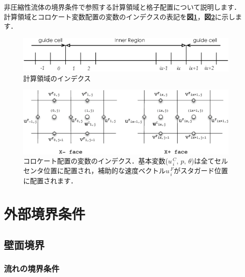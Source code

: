 非圧縮性流体の境界条件で参照する\hypertarget{tgt:grid_arrangement}{計算領域と格子配置}について説明します．
計算領域とコロケート変数配置の変数のインデクスの表記を\textbf{図\ref{fig:index_domain}}，\textbf{図\ref{fig:index_cc}}に示します．

\begin{figure}[htdp]
  \begin{center}
  \includegraphics[width=12cm,clip]{index_domain.eps}
  \end{center}
  \caption{計算領域のインデクス}
  \label{fig:index_domain}
\end{figure}

\begin{figure}[htdp]
  \begin{center}
  \includegraphics[width=14cm,clip]{index_cc.eps}
  \end{center}
  \caption{コロケート配置の変数のインデクス．基本変数($u_{\,i}^{\,C},\, p,\,\theta$)は全てセルセンタ位置に配置され，補助的な速度ベクトル$u_{\,i}^{\,F}$がスタガード位置に配置されます．}
  \label{fig:index_cc}
\end{figure}



\pagebreak
\section{外部境界条件}

%
\subsection{壁面境界}

\subsubsection{流れの境界条件}

